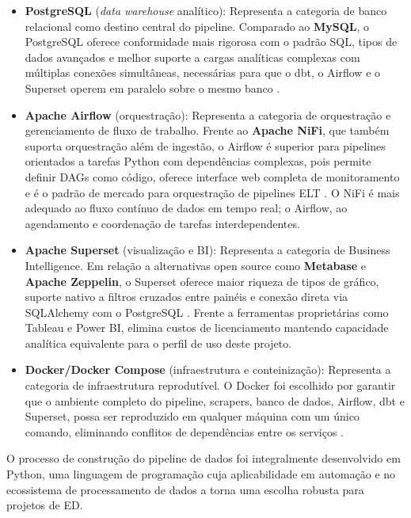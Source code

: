 \begin{itemize}
    \item \textbf{PostgreSQL} (\textit{data warehouse} analítico): Representa a categoria de banco relacional como destino central do pipeline. Comparado ao \textbf{MySQL}, o PostgreSQL oferece conformidade mais rigorosa com o padrão SQL, tipos de dados avançados e melhor suporte a cargas analíticas complexas com múltiplas conexões simultâneas, necessárias para que o dbt, o Airflow e o Superset operem em paralelo sobre o mesmo banco \cite{figueira2025arquitetura, gargouri2026multi}.

    \item \textbf{Apache Airflow} (orquestração): Representa a categoria de orquestração e gerenciamento de fluxo de trabalho. Frente ao \textbf{Apache NiFi}, que também suporta orquestração além de ingestão, o Airflow é superior para pipelines orientados a tarefas Python com dependências complexas, pois permite definir DAGs como código, oferece interface web completa de monitoramento e é o padrão de mercado para orquestração de pipelines ELT \cite{mbata2024survey}. O NiFi é mais adequado ao fluxo contínuo de dados em tempo real; o Airflow, ao agendamento e coordenação de tarefas interdependentes. 

    \item \textbf{Apache Superset} (visualização e BI): Representa a categoria de Business Intelligence. Em relação a alternativas open source como \textbf{Metabase} e \textbf{Apache Zeppelin}, o Superset oferece maior riqueza de tipos de gráfico, suporte nativo a filtros cruzados entre painéis e conexão direta via SQLAlchemy com o PostgreSQL \cite{figueira2025arquitetura, mbata2024survey}. Frente a ferramentas proprietárias como Tableau e Power BI, elimina custos de licenciamento mantendo capacidade analítica equivalente para o perfil de uso deste projeto.

    \item \textbf{Docker/Docker Compose} (infraestrutura e conteinização): Representa a categoria de infraestrutura reprodutível. O Docker foi escolhido por garantir que o ambiente completo do pipeline, scrapers, banco de dados, Airflow, dbt e Superset, possa ser reproduzido em qualquer máquina com um único comando, eliminando conflitos de dependências entre os serviços \cite{figueira2025arquitetura, gargouri2026multi}.
\end{itemize}

O processo de construção do pipeline de dados foi integralmente desenvolvido em Python, uma linguagem de programação cuja aplicabilidade em automação e no ecossistema de processamento de dados a torna uma escolha robusta para projetos de ED.

